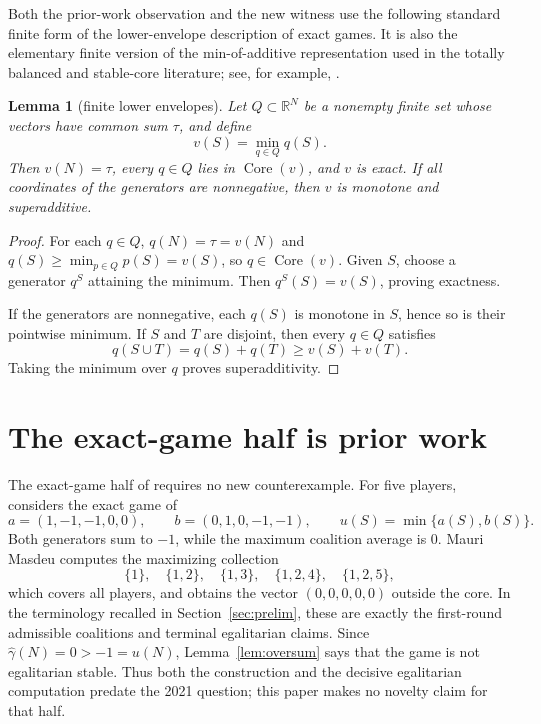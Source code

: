 \documentclass[11pt]{article}
\newtheorem{lemma}[theorem]{Lemma}
\newcommand{\R}{\mathbb{R}}
\newcommand{\core}{\operatorname{Core}}
\begin{document}
Both the prior-work observation and the new witness use the following
standard finite form of the lower-envelope description of exact games. It is
also the elementary finite version of the min-of-additive representation used
in the totally balanced and stable-core literature; see, for example,
\citet{Shellshear2009}.

\begin{lemma}[finite lower envelopes]\label{lem:generator}
Let $Q\subset\R^N$ be a nonempty finite set whose vectors have common sum
$\tau$, and define
\[
 v(S)=\min_{q\in Q}q(S).
\]
Then $v(N)=\tau$, every $q\in Q$ lies in $\core(v)$, and $v$ is exact. If all
coordinates of the generators are nonnegative, then $v$ is monotone and
superadditive.
\end{lemma}

\begin{proof}
For each $q\in Q$, $q(N)=\tau=v(N)$ and
$q(S)\ge\min_{p\in Q}p(S)=v(S)$, so $q\in\core(v)$. Given $S$, choose a
generator $q^S$ attaining the minimum. Then
$q^S(S)=v(S)$, proving exactness.

If the generators are nonnegative, each $q(S)$ is monotone in $S$, hence so
is their pointwise minimum. If $S$ and $T$ are disjoint, then every $q\in Q$
satisfies
\[
 q(S\cup T)=q(S)+q(T)\ge v(S)+v(T).
\]
Taking the minimum over $q$ proves superadditivity.
\end{proof}


\section{The exact-game half is prior work}
\label{sec:exact-prior}

The exact-game half of \citet{Dietzenbacher2021} requires no new
counterexample. For five players, \citet[][Example~5, pp.~40--41]{Mauri2017} considers
the exact game of \citet{Biswas1999}
\[
 a=(1,-1,-1,0,0),\qquad b=(0,1,0,-1,-1),\qquad
 u(S)=\min\{a(S),b(S)\}.
\]
Both generators sum to $-1$, while the maximum coalition average is $0$.
Mauri Masdeu computes the maximizing collection
\[
 \{1\},\quad\{1,2\},\quad\{1,3\},\quad\{1,2,4\},\quad\{1,2,5\},
\]
which covers all players, and obtains the vector $(0,0,0,0,0)$ outside the
core. In the terminology recalled in Section~\ref{sec:prelim}, these are
exactly the first-round admissible coalitions and terminal egalitarian claims.
Since $\widehat\gamma(N)=0>-1=u(N)$, Lemma~\ref{lem:oversum} says that the
game is not egalitarian stable. Thus both the construction and the decisive
egalitarian computation predate the 2021 question; this paper makes no
novelty claim for that half.
\end{document}
